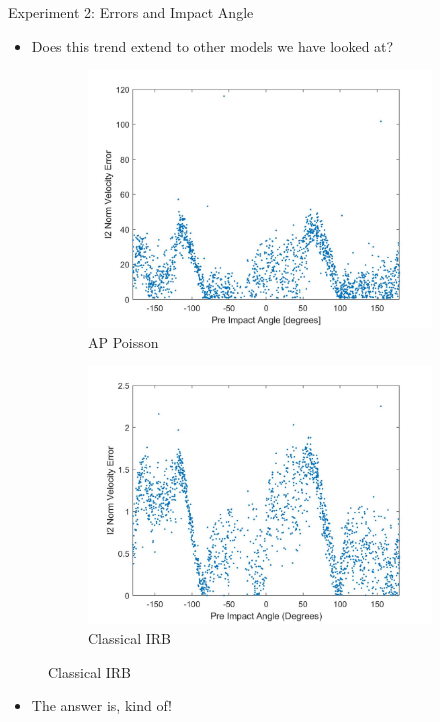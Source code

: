 \begin{frame}{Experiment 2: Errors and Impact Angle}
\begin{itemize}
    \item Does this trend extend to other models we have looked at?
\end{itemize}

\begin{figure}
    \centering
    \quad
    \begin{subfigure}[b]{0.45\linewidth}
        \includegraphics[scale=0.11]{figures/APAngleVsError.jpg}
        \caption{AP Poisson}
        \label{fig:AP_angle}
    \end{subfigure}
    \quad
    \begin{subfigure}[b]{0.45\linewidth}
        \includegraphics[scale=0.11]{figures/CIRBAngleVsError.jpg}
        \caption{Classical IRB}
        \label{fig:WangAngle}
    \end{subfigure}
\end{figure}
\vspace{-1\baselineskip}

\begin{itemize}
    \item The answer is, kind of!
\end{itemize}

\end{frame}

